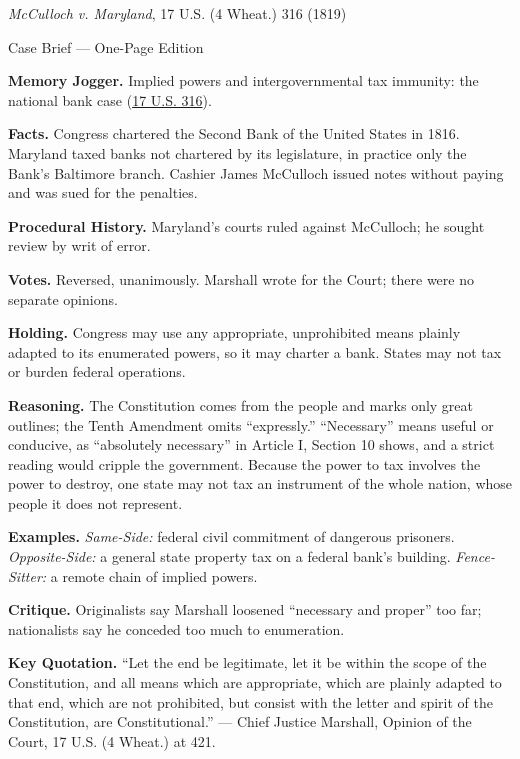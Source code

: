 \documentclass[12pt]{article}
\begin{document}
\begin{center}
{\Large \textit{McCulloch v. Maryland}, 17 U.S. (4 Wheat.) 316 (1819)\par}
\vspace{0.3em}
{\normalsize Case Brief --- One-Page Edition\par}
\end{center}

\textbf{Memory Jogger.} Implied powers and intergovernmental tax immunity: the national bank case (\href{https://supreme.justia.com/cases/federal/us/17/316/}{17 U.S. 316}).

\textbf{Facts.} Congress chartered the Second Bank of the United States in 1816. Maryland taxed banks not chartered by its legislature, in practice only the Bank's Baltimore branch. Cashier James McCulloch issued notes without paying and was sued for the penalties.

\textbf{Procedural History.} Maryland's courts ruled against McCulloch; he sought review by writ of error.

\textbf{Votes.} Reversed, unanimously. Marshall wrote for the Court; there were no separate opinions.

\textbf{Holding.} Congress may use any appropriate, unprohibited means plainly adapted to its enumerated powers, so it may charter a bank. States may not tax or burden federal operations.

\textbf{Reasoning.} The Constitution comes from the people and marks only great outlines; the Tenth Amendment omits ``expressly.'' ``Necessary'' means useful or conducive, as ``absolutely necessary'' in Article I, Section 10 shows, and a strict reading would cripple the government. Because the power to tax involves the power to destroy, one state may not tax an instrument of the whole nation, whose people it does not represent.

\textbf{Examples.} \emph{Same-Side:} federal civil commitment of dangerous prisoners. \emph{Opposite-Side:} a general state property tax on a federal bank's building. \emph{Fence-Sitter:} a remote chain of implied powers.

\textbf{Critique.} Originalists say Marshall loosened ``necessary and proper'' too far; nationalists say he conceded too much to enumeration.

\textbf{Key Quotation.} ``Let the end be legitimate, let it be within the scope of the Constitution, and all means which are appropriate, which are plainly adapted to that end, which are not prohibited, but consist with the letter and spirit of the Constitution, are Constitutional.'' --- Chief Justice Marshall, Opinion of the Court, 17 U.S. (4 Wheat.) at 421.
\end{document}
